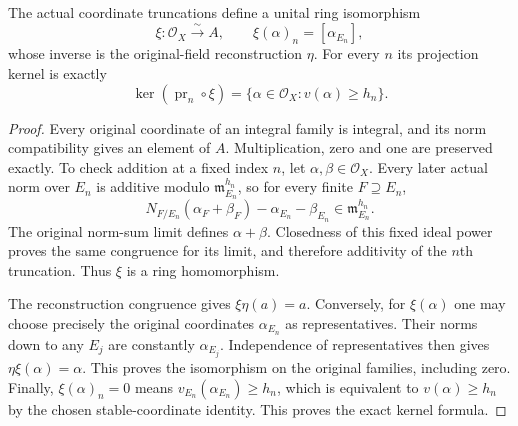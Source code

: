 \begin{theorem}
\label{fw:norm-limit-truncation-equivalence}
\leanok
The actual coordinate truncations define a unital ring isomorphism
\[
 \xi:\mathcal O_X\xrightarrow{\ \sim\ }A,\qquad
 \xi(\alpha)_n=[\alpha_{E_n}],
\]
whose inverse is the original-field reconstruction $\eta$.
For every $n$ its projection kernel is exactly
\[
 \ker(\operatorname{pr}_n\circ\xi)
        =\{\alpha\in\mathcal O_X:v(\alpha)\geq h_n\}.
\]
\end{theorem}
\begin{proof}
Every original coordinate of an integral family is integral, and its
norm compatibility gives an element of $A$. Multiplication, zero and
one are preserved exactly. To check addition at a fixed index $n$,
let $\alpha,\beta\in\mathcal O_X$. Every later actual norm over $E_n$
is additive modulo $\mathfrak m_{E_n}^{h_n}$, so for every finite
$F\supseteq E_n$,
\[
 N_{F/E_n}(\alpha_F+\beta_F)-\alpha_{E_n}-\beta_{E_n}
              \in\mathfrak m_{E_n}^{h_n}.
\]
The original norm-sum limit defines $\alpha+\beta$.
Closedness of this fixed ideal power proves the same congruence for
its limit, and therefore additivity of the $n$th truncation.
Thus $\xi$ is a ring homomorphism.

The reconstruction congruence gives $\xi\eta(a)=a$.
Conversely, for $\xi(\alpha)$ one may choose precisely the original
coordinates $\alpha_{E_n}$ as representatives. Their norms down to
any $E_j$ are constantly $\alpha_{E_j}$. Independence of representatives
then gives $\eta\xi(\alpha)=\alpha$. This proves the isomorphism on
the original families, including zero.
Finally, $\xi(\alpha)_n=0$ means
$v_{E_n}(\alpha_{E_n})\geq h_n$, which is equivalent to
$v(\alpha)\geq h_n$ by the chosen stable-coordinate identity.
This proves the exact kernel formula.
\end{proof}

